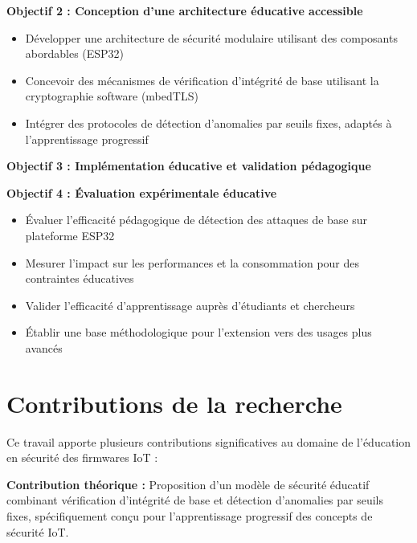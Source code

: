 \textbf{Objectif 2 : Conception d'une architecture éducative accessible}
\begin{itemize}
    \item Développer une architecture de sécurité modulaire utilisant des composants abordables (ESP32)
    \item Concevoir des mécanismes de vérification d'intégrité de base utilisant la cryptographie software (mbedTLS)
    \item Intégrer des protocoles de détection d'anomalies par seuils fixes, adaptés à l'apprentissage progressif
\end{itemize}

\textbf{Objectif 3 : Implémentation éducative et validation pédagogique}

\textbf{Objectif 4 : Évaluation expérimentale éducative}
\begin{itemize}
    \item Évaluer l'efficacité pédagogique de détection des attaques de base sur plateforme ESP32
    \item Mesurer l'impact sur les performances et la consommation pour des contraintes éducatives
    \item Valider l'efficacité d'apprentissage auprès d'étudiants et chercheurs
    \item Établir une base méthodologique pour l'extension vers des usages plus avancés
\end{itemize}

\section{Contributions de la recherche}

Ce travail apporte plusieurs contributions significatives au domaine de l'éducation en sécurité des firmwares IoT :

\textbf{Contribution théorique :} Proposition d'un modèle de sécurité éducatif combinant vérification d'intégrité de base et détection d'anomalies par seuils fixes, spécifiquement conçu pour l'apprentissage progressif des concepts de sécurité IoT.

